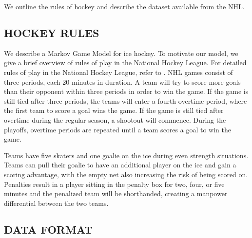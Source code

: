 \documentclass[]{article}
\begin{document}
We outline the rules of hockey and describe the dataset available from the NHL.

\subsection{HOCKEY RULES}
We describe a Markov Game Model for ice hockey. To motivate our model, we give a brief overview of rules of play in the National Hockey League. For detailed rules of play in the National Hockey League, refer to \citep{NHLRulebook2014}. NHL games consist of three periods, each 20 minutes in duration. A team will try to score more goals than their opponent within three periods in order to win the game. If the game is still tied after three periods, the teams will enter a fourth overtime period, where the first team to score a goal wins the game. If the game is still tied after overtime during the regular season, a shootout will commence. During the playoffs, overtime periods are repeated until a team scores a goal to win the game.

Teams have five skaters and one goalie on the ice during even strength situations. Teams can pull their goalie to have an additional player on the ice and gain a scoring advantage, with the empty net also increasing the risk of being scored on. Penalties result in a player sitting in the penalty box for two, four, or five minutes and the penalized team will be shorthanded, creating a manpower differential between the two teams.

\subsection{DATA FORMAT}
\end{document}
